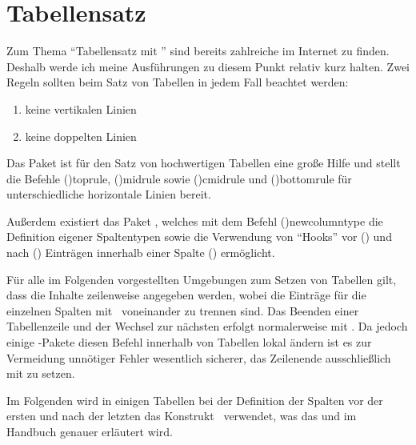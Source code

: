 \documentclass[%
  english,ngerman,%
  cdgeometry=no,DIV=12,%
  cd=false,cdfont=false,cdtitle=true,%
  headings=normal,%
  automark,%
  listof=toc,%
]{tudscrartcl}
\begin{document}
\section{%
  Tabellensatz%
  \label{sec:tables}%
}

Zum Thema \enquote{Tabellensatz mit } sind bereits zahlreiche 
\cite{reichert2012} im Internet zu finden. Deshalb werde ich meine Ausführungen 
zu diesem Punkt relativ kurz halten. Zwei Regeln sollten beim Satz von Tabellen 
in jedem Fall beachtet werden:
%
\begin{enumerate}[%
  itemindent=0pt,noitemsep,%
  labelwidth=*,labelsep=1em,label=\Roman*.%
]
\item keine vertikalen Linien
\item keine doppelten Linien
\end{enumerate}
%
Das Paket  ist für den Satz von hochwertigen Tabellen eine 
große Hilfe und stellt die Befehle \Macro(){toprule}, 
\Macro(){midrule} sowie \Macro(){cmidrule} 
und \Macro(){bottomrule} für unterschiedliche horizontale 
Linien bereit.
%
\begin{Preamble}
\usepackage{booktabs}
\end{Preamble}
%
Außerdem existiert das Paket , welches mit dem Befehl 
\Macro(){newcolumntype} die Definition eigener Spaltentypen 
sowie die Verwendung von \enquote{Hooks} vor (\PValue{>\MPValue{\dots}}) und 
nach (\PValue{<\MPValue{\dots}}) Einträgen innerhalb einer Spalte 
(\PValue{>\MPValue{\dots}}\PValue{<\MPValue{\dots}}) 
ermöglicht.
%
\begin{Preamble}
\usepackage{array}
\end{Preamble}
%
Für alle im Folgenden vorgestellten Umgebungen zum Setzen von Tabellen gilt, 
dass die Inhalte zeilenweise angegeben werden, wobei die Einträge für die 
einzelnen Spalten mit~\PValue{\&} voneinander zu trennen sind. Das Beenden 
einer Tabellenzeile und der Wechsel zur nächsten erfolgt normalerweise mit 
\PValue{\bsc\bsc}. Da jedoch einige -Pakete 
diesen Befehl innerhalb von Tabellen lokal ändern ist es zur Vermeidung 
unnötiger Fehler wesentlich sicherer, das Zeilenende ausschließlich mit 
 zu setzen.

Im Folgenden wird in einigen Tabellen bei der Definition der Spalten vor der 
ersten und nach der letzten das Konstrukt~ verwendet, 
was das  
und im Handbuch genauer erläutert wird. 
\end{document}
